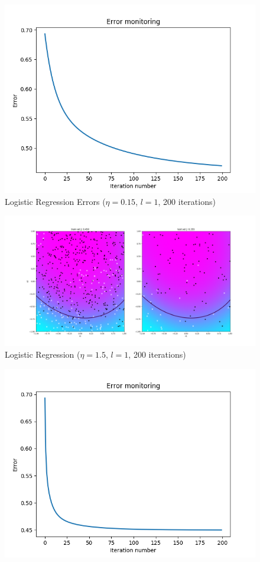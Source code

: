 \documentclass[12pt,halfline,a4paper]{ouparticle}
\begin{document}
\begin{enumerate}
\begin{figure}[H]
	        \includegraphics[width=\textwidth]{figures/logreg_d2_it200_015_error.png}
	    \caption{Logistic Regression Errors ($\eta = 0.15$, $l = 1$, 200
	    iterations)}
	\end{figure}
	\begin{figure}[H]
  	\centering
	        \includegraphics[width=\textwidth]{figures/logreg_d2_it200_15.png}
	    \caption{Logistic Regression ($\eta = 1.5$, $l = 1$, 200 iterations)}
	\end{figure}
	\begin{figure}[H]
  	\centering
	        \includegraphics[width=\textwidth]{figures/logreg_d2_it200_15_error.png}

\end{figure}
\end{enumerate}
\end{document}

